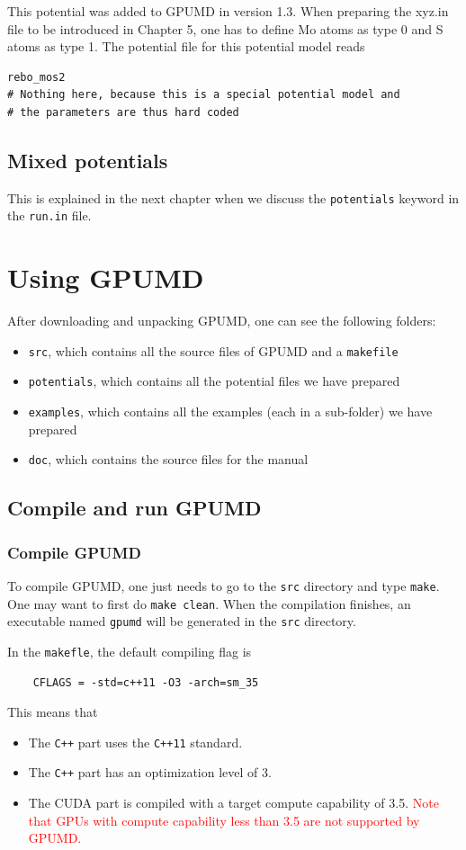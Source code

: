 \documentclass[12pt,a4paper]{report}
\begin{document}
This potential was added to GPUMD in version 1.3. When preparing the xyz.in file to be introduced in Chapter 5, one has to define Mo atoms as type 0 and S atoms as type 1. The potential file for this potential model reads
\begin{verbatim}
rebo_mos2
# Nothing here, because this is a special potential model and 
# the parameters are thus hard coded
\end{verbatim}

\section{Mixed potentials}

This is explained in the next chapter when we discuss the \verb"potentials" keyword in the \verb"run.in" file.

\chapter{Using GPUMD \label{chapter:usage}}

After downloading and unpacking GPUMD, one can see the following folders:
\begin{itemize}
\item \verb"src", which contains all the source files of GPUMD and a \verb"makefile"
\item \verb"potentials", which contains all the potential files we have prepared
\item \verb"examples", which contains all the examples (each in a sub-folder) we have prepared
\item \verb"doc", which contains the source files for the manual
\end{itemize}

\section{Compile and run GPUMD}

\subsection{Compile GPUMD}

To compile GPUMD, one just needs to go to the \verb"src" directory and type \verb"make". One may want to first do \verb"make clean". When the compilation finishes, an executable named \verb"gpumd" will be generated in the \verb"src" directory.

In the \verb"makefle", the default compiling flag is
\begin{verbatim}
    CFLAGS = -std=c++11 -O3 -arch=sm_35
\end{verbatim}
This means that
\begin{itemize}
\item The \verb"C++" part uses the \verb"C++11" standard.
\item The \verb"C++" part has an optimization level of 3.
\item The CUDA part is compiled with a target compute capability of 3.5. \textcolor{red}{Note that GPUs with compute capability less than 3.5 are not supported by GPUMD.}
\end{itemize}
\end{document}
